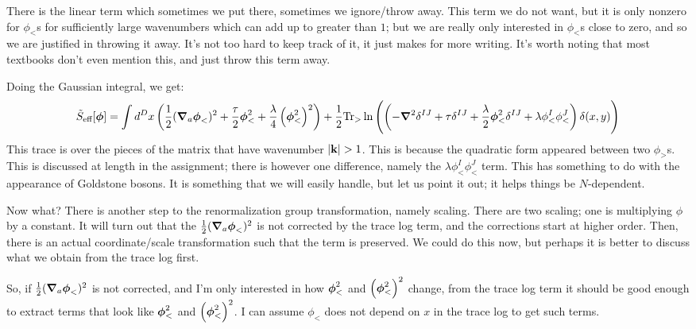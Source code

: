 There is the linear term which sometimes we put there, sometimes we ignore/throw away. This term we do not want, but it is only nonzero for $\phi_<$s for sufficiently large wavenumbers which can add up to greater than $1$; but we are really only interested in $\phi_<$s close to zero, and so we are justified in throwing it away. It's not too hard to keep track of it, it just makes for more writing. It's worth noting that most textbooks don't even mention this, and just throw this term away.

Doing the Gaussian integral, we get:
\begin{equation}
    \tilde{S}_{\text{eff}}[\gv{\phi}] = \int d^Dx \left(\frac{1}{2}(\nabla_a \gv{\phi}_<)^2 + \frac{\tau}{2}\gv{\phi}^2_< + \frac{\lambda}{4}\left(\gv{\phi}^2_<\right)^2\right) + \frac{1}{2}\Tr_>\ln\left(\left(-\nabla^2\delta^{IJ} + \tau\delta^{IJ} + \frac{\lambda}{2}\gv{\phi}^2_<\delta^{IJ} + \lambda\phi_<^I\phi_<^J\right)\delta(x, y)\right)
\end{equation}
This trace is over the pieces of the matrix that have wavenumber $\lvert \mathbf{k} \rvert > 1$. This is because the quadratic form appeared between two $\phi_>$s. This is discussed at length in the assignment; there is however one difference, namely the $\lambda \phi_<^I\phi_<^J$ term. This has something to do with the appearance of Goldstone bosons. It is something that we will easily handle, but let us point it out; it helps things be $N$-dependent.

Now what? There is another step to the renormalization group transformation, namely scaling. There are two scaling; one is multiplying $\phi$ by a constant. It will turn out that the $\frac{1}{2}(\nabla_a \gv{\phi}_<)^2$ is not corrected by the trace log term, and the corrections start at higher order. Then, there is an actual coordinate/scale transformation such that the term is preserved. We could do this now, but perhaps it is better to discuss what we obtain from the trace log first.

So, if $\frac{1}{2}(\nabla_a \gv{\phi}_<)^2$ is not corrected, and I'm only interested in how $\gv{\phi}^2_<$ and $\left(\gv{\phi}^2_<\right)^2$ change, from the trace log term it should be good enough to extract terms that look like $\gv{\phi}^2_<$ and $\left(\gv{\phi}^2_<\right)^2$. I can assume $\phi_<$ does not depend on $x$ in the trace log to get such terms.

